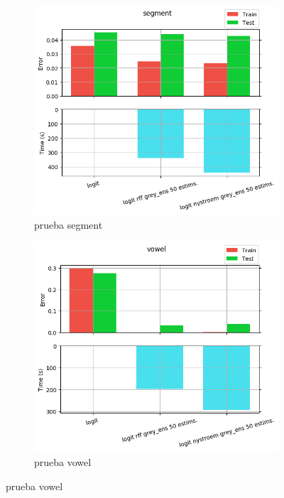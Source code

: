 \begin{figure}[ht]
  \centering
  \begin{subfigure}[b]{0.5\linewidth}
    \centering\captionsetup{width=.8\linewidth}\includegraphics[width=\imgscale\linewidth]{Figures/2_4/segment}
    \caption{prueba segment}
    \label{fig:2_4_segment}
  \end{subfigure}%
  \begin{subfigure}[b]{0.5\linewidth}
    \centering\captionsetup{width=.8\linewidth}\includegraphics[width=\imgscale\linewidth]{Figures/2_4/vowel}
    \caption{prueba vowel}
    \label{fig:2_4_vowel}
  \end{subfigure}
\end{figure}
